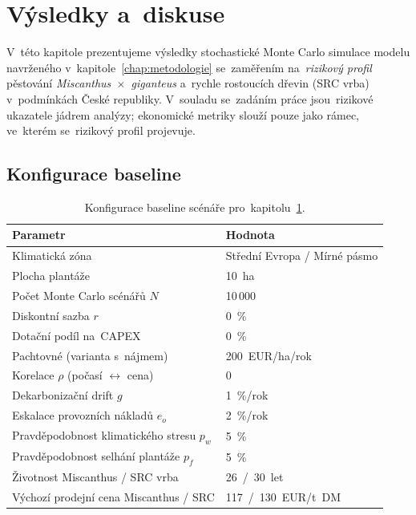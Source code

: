 \chapter{Výsledky a~diskuse}
\label{chap:vysledky}

V~této kapitole prezentujeme výsledky stochastické Monte Carlo simulace
modelu navrženého v~kapitole~\ref{chap:metodologie} se~zaměřením
na~\emph{rizikový profil} pěstování \textit{Miscanthus~$\times$~giganteus}
a~rychle rostoucích dřevin (SRC vrba) v~podmínkách České republiky.
V~souladu se~zadáním práce jsou~rizikové ukazatele jádrem analýzy;
ekonomické metriky slouží pouze jako rámec, ve~kterém se~rizikový profil
projevuje.

\section{Konfigurace baseline}
\label{sec:vysledky-baseline-konfig}

\begin{table}[H]
\centering
\caption{Konfigurace baseline scénáře pro~kapitolu~\ref{chap:vysledky}.}
\label{tab:baseline-config}
\renewcommand{\arraystretch}{1.2}
\begin{tabular}{ll}
\toprule
\textbf{Parametr} & \textbf{Hodnota} \\
\midrule
Klimatická zóna & Střední Evropa / Mírné pásmo \\
Plocha plantáže & 10~ha \\
Počet Monte Carlo scénářů $N$ & 10\,000 \\
Diskontní sazba $r$ & 0~\% \\
Dotační podíl na~CAPEX & 0~\% \\
Pachtovné (varianta s~nájmem) & 200~EUR/ha/rok \\
Korelace $\rho$ (počasí $\leftrightarrow$ cena) & 0 \\
Dekarbonizační drift $g$ & 1~\%/rok \\
Eskalace provozních nákladů $e_o$ & 2~\%/rok \\
Pravděpodobnost klimatického stresu $p_w$ & 5~\% \\
Pravděpodobnost selhání plantáže $p_f$ & 5~\% \\
Životnost Miscanthus / SRC vrba & 26~/~30~let \\
Výchozí prodejní cena Miscanthus / SRC & 117~/~130~EUR/t~DM \\
\bottomrule
\end{tabular}
\end{table}

